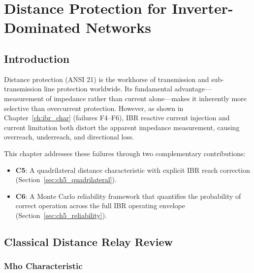 \chapter{Distance Protection for Inverter-Dominated Networks}
\label{ch:distance}

\section{Introduction}
\label{sec:ch5_intro}

Distance protection (ANSI 21) is the workhorse of transmission and
sub-transmission line protection worldwide. Its fundamental advantage—
measurement of impedance rather than current alone—makes it inherently
more selective than overcurrent protection. However, as shown in
Chapter~\ref{ch:ibr_char} (failures F4--F6), IBR reactive current
injection and current limitation both distort the apparent impedance
measurement, causing overreach, underreach, and directional loss.

This chapter addresses these failures through two complementary contributions:
\begin{itemize}
\item \textbf{C5}: A quadrilateral distance characteristic with explicit
      IBR reach correction (Section~\ref{sec:ch5_quadrilateral}).
\item \textbf{C6}: A Monte Carlo reliability framework that quantifies
      the probability of correct operation across the full
      IBR operating envelope (Section~\ref{sec:ch5_reliability}).
\end{itemize}

\section{Classical Distance Relay Review}
\label{sec:ch5_review}

\subsection{Mho Characteristic}

